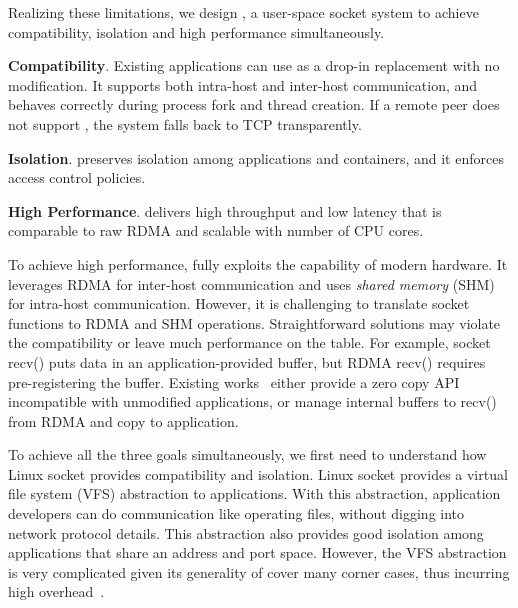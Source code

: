 
Realizing these limitations, we design \sys{}, a user-space socket system to achieve compatibility, isolation and high performance simultaneously.
\begin{ecompact}
	\item \textbf{Compatibility}.
	Existing applications can use \sys{} as a drop-in replacement with no modification.
	It supports both intra-host and inter-host communication, and behaves correctly during process fork and thread creation.
	If a remote peer does not support \sys{}, the system falls back to TCP transparently.
	\item \textbf{Isolation}.
	\sys{} preserves isolation among applications and containers, and it enforces access control policies.
	\item \textbf{High Performance}.
	\sys{} delivers high throughput and low latency that is comparable to raw RDMA and scalable with number of CPU cores.
\end{ecompact}


To achieve high performance, \sys fully exploits the capability of modern hardware. It leverages RDMA for inter-host communication and uses \emph{shared memory} (SHM) for intra-host communication. However, it is challenging to translate socket functions to RDMA and SHM operations. Straightforward solutions may violate the compatibility or leave much performance on the table. For example, socket recv() puts data in an application-provided buffer, but RDMA recv() requires pre-registering the buffer. Existing works~\cite{rsockets} either provide a zero copy API incompatible with unmodified applications, or manage internal buffers to recv() from RDMA and copy to application. %

To achieve all the three goals simultaneously, we first need to understand how Linux socket provides compatibility and isolation. Linux socket provides a virtual file system (VFS) abstraction to applications. With this abstraction, application developers can do communication like operating files, without digging into network protocol details. This abstraction also provides good isolation among applications that share an address and port space. However, the VFS abstraction is very complicated given its generality of cover many corner cases, thus incurring high overhead~\cite{clark1989analysis,boyd2010analysis,jeong2014mtcp}.   

